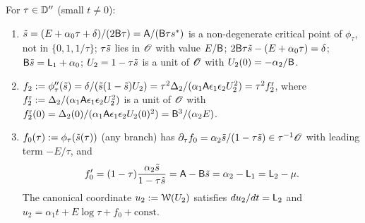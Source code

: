 \begin{lem}
\label{lem:lea-regdata}
For $\tau\in\mathbb{D}''$ (small $t\neq 0$):
\begin{enumerate}
\item $\tilde{s} = (E+\alpha_0\tau+\delta)/(2\mathsf{B}\tau) = \mathsf{A}/(\mathsf{B}\tau s^{\ast})$ is a non-degenerate critical point of $\phi_\tau$, not in $\{0,1,1/\tau\}$; $\tau\tilde{s}$ lies in $\mathscr{O}$ with value $E/\mathsf{B}$; $2\mathsf{B}\tau\tilde{s} - (E+\alpha_0\tau) = \delta$; $\mathsf{B}\tilde{s} = \mathsf{L}_1+\alpha_0$; $U_2 = 1-\tau\tilde{s}$ is a unit of $\mathscr{O}$ with $U_2(0) = -\alpha_2/\mathsf{B}$.
\item $f_2 := \phi_\tau''(\tilde{s}) = \delta/(\tilde{s}(1-\tilde{s})U_2) = \tau^2\Delta_2/(\alpha_1\mathsf{A}\epsilon_1\epsilon_2U_2^2) = \tau^2f_{2}^{\mathrm{r}}$, where $f_2^{\mathrm{r}} := \Delta_2/(\alpha_1\mathsf{A}\epsilon_1\epsilon_2U_2^2)$ is a unit of $\mathscr{O}$ with $f_2^{\mathrm{r}}(0) = \Delta_2(0)/(\alpha_1\mathsf{A}\epsilon_1\epsilon_2U_2(0)^2) = \mathsf{B}^3/(\alpha_2E)$.
\item $f_0(\tau) := \phi_\tau(\tilde{s}(\tau))$ (any branch) has $\partial_\tau f_0 = \alpha_2\tilde{s}/(1-\tau\tilde{s})\in\tau^{-1}\mathscr{O}$ with leading term $-E/\tau$, and
\begin{equation}
\label{eq:lea-f0}
f_0' = (1-\tau)\frac{\alpha_2\tilde{s}}{1-\tau\tilde{s}} = \mathsf{A} - \mathsf{B}\tilde{s} = \alpha_2 - \mathsf{L}_1 = \mathsf{L}_2 - \mu .
\end{equation}
The canonical coordinate $u_2 := \mathcal{W}(U_2)$ satisfies $du_2/dt = \mathsf{L}_2$ and $u_2 = \alpha_1t + E\log\tau + f_0 + \mathrm{const}$.
\end{enumerate}
\end{lem}

